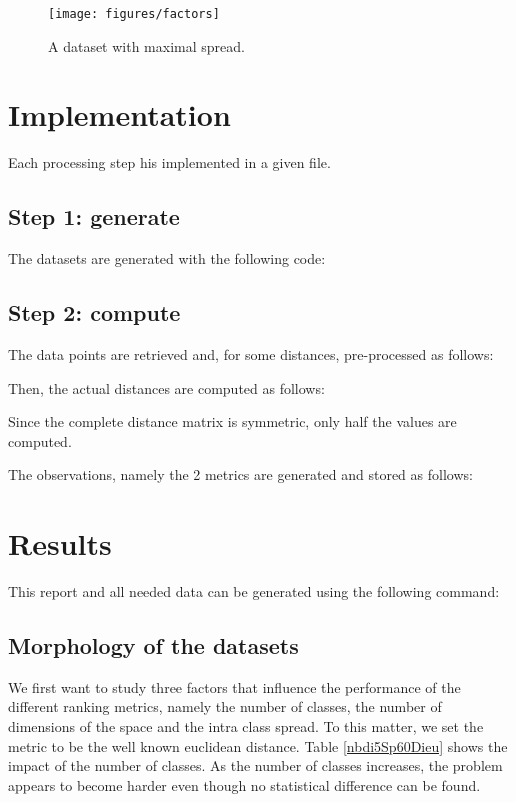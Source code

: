 \documentclass[12pt,a4paper,fleqn]{tufte-handout}
\begin{document}
\begin{figure}
\texttt{[image: figures/factors]}
\caption{A dataset with maximal spread.}
\label{scatter}
\end{figure}

\section{Implementation}

Each processing step his implemented in a given file.

\subsection{Step 1: generate}

The datasets are generated with the following code:


\subsection{Step 2: compute} 


The data points are retrieved and, for some distances, pre-processed as follows:
 

Then, the actual distances are computed as follows:
 
Since the complete distance matrix is symmetric, only half the values are computed.

The observations, namely the 2 metrics  are generated and stored as follows:
   

\section{Results}

This report and all needed data can be generated using the following command:


\subsection{Morphology of the datasets}

We first want to study three factors that influence the performance of the different ranking metrics, namely the number of classes, the number of dimensions of the space and the intra class spread. To this matter, we set the metric to be the well known euclidean distance. Table \ref{nbdi5Sp60Dieu} shows the impact of the number of classes. As the number of classes increases, the problem appears to become harder even though no statistical difference can be found.
\end{document}
